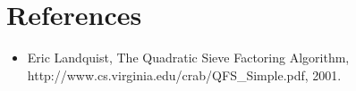 \documentclass[letterpaper, 10pt, conference]{ieeeconf}  %
\theoremstyle{definition}
\theoremstyle{property}
\begin{document}
\section*{References}
\begin{itemize}
    \item Eric Landquist, The Quadratic Sieve Factoring Algorithm, http://www.cs.virginia.edu/crab/QFS\_Simple.pdf, 2001.
\end{itemize}
\end{document}
